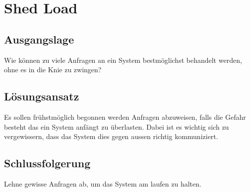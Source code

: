 \section{Shed Load}

\subsection{Ausgangslage}

Wie können zu viele Anfragen an ein System bestmöglichst behandelt werden, ohne es in die Knie zu zwingen?

\subsection{Lösungsansatz}

Es sollen frühstmöglich begonnen werden Anfragen abzuweisen, falls die Gefahr besteht das ein System anfängt zu überlasten. Dabei ist es wichtig sich zu vergewissern, dass das System dies gegen aussen richtig kommuniziert.

\subsection{Schlussfolgerung}

Lehne gewisse Anfragen ab, um das System am laufen zu halten.

